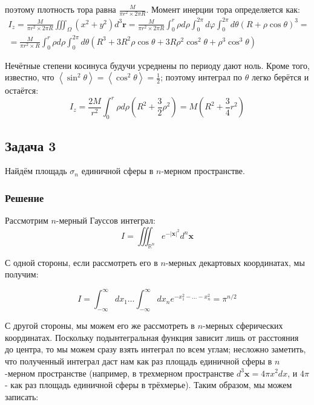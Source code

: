 \documentclass[a4paper,12pt]{article}
\begin{document}
 \noindent
поэтому плотность тора равна $\frac{M}{\pi r^{2}\times2\pi R}$. Момент
инерции тора определяется как:
\begin{multline*}
I_{z}=\frac{M}{\pi r^{2}\times2\pi R}\iiint_{\Omega}(x^{2}+y^{2})d^{3}\mathbf{r}=\frac{M}{\pi r^{2}\times2\pi R}\int_{0}^{r}\rho d\rho\int_{0}^{2\pi}d\varphi\int_{0}^{2\pi}d\theta(R+\rho\cos\theta)^{3}=\\
=\frac{M}{\pi r^{2}\times R}\int_{0}^{r}\rho d\rho\int_{0}^{2\pi}d\theta(R^{3}+3R^{2}\rho\cos\theta+3R\rho^{2}\cos^{2}\theta+\rho^{3}\cos^{3}\theta)
\end{multline*}

 \noindent
Нечётные степени косинуса будучи усреднены по периоду дают ноль. Кроме
того, известно, что $\left\langle \sin^{2}\theta\right\rangle =\left\langle \cos^{2}\theta\right\rangle =\frac{1}{2}$;
поэтому интеграл по $\theta$ легко берётся и остаётся:
\[
I_{z}=\frac{2M}{r^{2}}\int_{0}^{r}\rho d\rho(R^{2}+\frac{3}{2}\rho^{2})=M\left(R^{2}+\frac{3}{4}r^{2}\right)
\]



\subsection*{Задача 3}

Найдём площадь $\sigma_{n}$ единичной сферы в $n$-мерном пространстве.


\subsubsection*{Решение}

Рассмотрим $n$-мерный Гауссов интеграл:
\[
I=\iiint_{\mathbb{R}^{n}}e^{-|\mathbf{x}|^{2}}d^{n}\mathbf{x}
\]

 \noindent
С одной стороны, если рассмотреть его в $n$-мерных декартовых координатах,
мы получим:

\[
I=\int_{-\infty}^{\infty}dx_{1}\dots\int_{-\infty}^{\infty}dx_{n}e^{-x_{1}^{2}-\dots-x_{n}^{2}}=\pi^{n/2}
\]

 \noindent
С другой стороны, мы можем его же рассмотреть в $n$-мерных сферических
координатах. Поскольку подынтегральная функция зависит лишь от расстояния
до центра, то мы можем сразу взять интеграл по всем углам; несложно
заметить, что полученный интеграл даст нам как раз площадь единичной
сферы в $n$-мерном пространстве (например, в трехмерном пространстве
$d^{3}\mathbf{x}=4\pi x^{2}dx$, и $4\pi$ - как раз площадь единичной
сферы в трёхмерье). Таким образом, мы можем записать:
\end{document}

